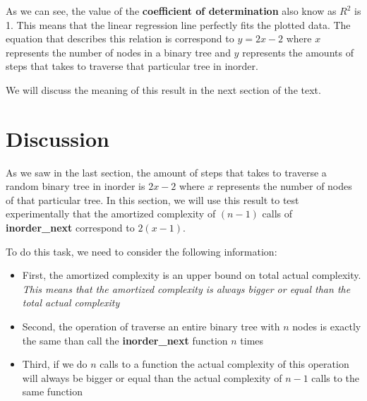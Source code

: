 \documentclass[12p]{article}
\begin{document}
As we can see, the value of the \textbf{coefficient of determination} also know as $R^2$ is 1. This means that the linear regression line perfectly fits the plotted data. The equation that describes this relation is correspond to $y=2x-2$ where $x$ represents the number of nodes in a binary tree and $y$ represents the amounts of steps that takes to traverse that particular tree in inorder.

\bigskip

We will discuss the meaning of this result in the next section of the text.


  \section{Discussion}

As we saw in the last section, the amount of steps that takes to traverse a random binary tree in inorder is $2x-2$ where $x$ represents the number of nodes of that particular tree. In this section, we will use this result to test experimentally that the amortized complexity of $(n-1)$ calls of \textbf{inorder\_next} correspond to $2(x-1)$.

\bigskip

To do this task, we need to consider the following information:
\begin{itemize}
  \item First, the amortized complexity is an upper bound on total actual complexity. \textit{This means that the amortized complexity is always bigger or equal than the total actual complexity}
  \item Second, the operation of traverse an entire binary tree with $n$ nodes is exactly the same than call the \textbf{inorder\_next} function $n$ times
  \item Third, if we do $n$ calls to a function the actual complexity of this operation will always be bigger or equal than the actual complexity of $n-1$ calls to the same function
\end{itemize}

\bigskip
\bigskip
\end{document}
